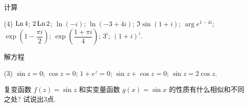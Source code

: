 \begin{homework}
\begin{exlist}
			\item 计算
				\begin{tasks}(4)
					\task $\operatorname{Ln} 4$;
					\task $2\operatorname{Ln}2$;
					\task $\ln(-i)$;
					\task $\ln(-3+4i)$;
					\task $\Im\sin(1+i)$;
					\task $\arg e^{1-4i}$;
					\task $\exp\left(1-\dfrac{\pi i}2\right)$;
					\task $\exp\left(\dfrac{1+\pi i}4\right)$;
					\task $3^i$;
					\task $(1+i)^i$.
				\end{tasks}
			\item 解方程 
				\begin{tasks}(3)
					\task $\sin z=0$;
					\task $\cos z=0$;
					\task $1+e^z=0$;
					\task $\sin z+\cos z=0$;
					\task $\sin z=2\cos z$.
				\end{tasks}
			\item 复变函数 $f(z)=\sin z$ 和实变量函数 $g(x)=\sin x$ 的性质有什么相似和不同之处? 试说出3点.
		\end{exlist}
\end{homework}
	


